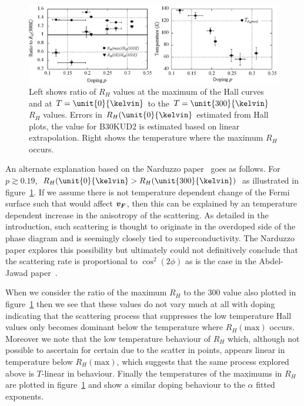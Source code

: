 \begin{figure}[htbp]
    \begin{center}
        \includegraphics[scale=0.8]{Chapter-HallBSCO/Figures/RhRatios/RhRatios}
        \caption{Left shows ratio of $R_H$ values at the maximum of the Hall curves and at $T=\unit{0}{\kelvin}$ to the $T=\unit{300}{\kelvin}$ $R_H$ values. Errors in $R_H(\unit{0}{\kelvin}$ estimated from Hall plots, the value for B30KUD2 is estimated based on linear extrapolation. Right shows the temperature where the maximum $R_H$ occurs.}
        \label{Fig:ResH:RhRatios}
    \end{center}
\end{figure}

An alternate explanation based on the Narduzzo paper~\cite{Narduzzo2008} goes as follows. For $p \gtrsim 0.19$, $R_H(\unit{0}{\kelvin} > R_H(\unit{300}{\kelvin})$ as illustrated in figure~\ref{Fig:ResH:RhRatios}. If we assume there is not temperature dependent change of the Fermi surface such that would affect $\boldsymbol{v_F}$, then this can be explained by an temperature dependent increase in the anisotropy of the scattering. As detailed in the introduction, such scattering is thought to originate in the overdoped side of the phase diagram and is seemingly closely tied to superconductivity. The Narduzzo paper explores this possibility but ultimately could not definitively conclude that the scattering rate is proportional to $\cos^2(2\phi)$ as is the case in the Abdel-Jawad paper~\cite{Abdel-Jawad2007}.

When we consider the ratio of the maximum $R_H$ to the \unit{300}{\kelvin} value also plotted in figure~\ref{Fig:ResH:RhRatios} then we see that these values do not vary much at all with doping indicating that the scattering process that suppresses the low temperature Hall values only becomes dominant below the temperature where $R_H(\textrm{max})$ occurs. Moreover we note that the low temperature behaviour of $R_H$ which, although not possible to ascertain for certain due to the scatter in points, appears linear in temperature below $R_H(\textrm{max})$, which suggests that the same process explored above is $T$-linear in behaviour. Finally the temperatures of the maximums in $R_H$ are plotted in figure~\ref{Fig:ResH:RhRatios} and show a similar doping behaviour to the $\alpha$ fitted exponents.




